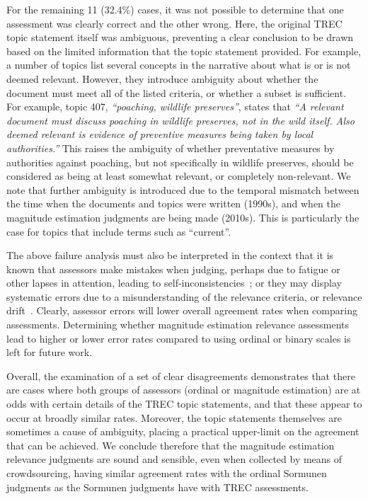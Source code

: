 For the remaining 11 (32.4\%) cases, it was not possible to
determine that one assessment was clearly correct and the
other wrong.
Here, the original TREC topic statement itself was ambiguous,
preventing a clear conclusion to be drawn based on the limited
information that the topic statement provided.
For example, a number of topics list several concepts in the narrative
about what is or is not deemed relevant.
However, they introduce ambiguity about whether the document must meet
all of the listed criteria, or whether a subset is sufficient.
For example, topic 407, \emph{``poaching, wildlife preserves''}, states
that 
\emph{``A relevant document must discuss poaching in wildlife
preserves, not in the wild itself.
Also deemed relevant is evidence of preventive measures being taken by
local authorities.''} This raises the ambiguity of whether preventative
measures by authorities against poaching, but not specifically in
wildlife preserves, should be considered as being at least somewhat
relevant,
or completely non-relevant.
We note that further ambiguity is introduced due to the temporal
mismatch between the time when the documents and topics were written (1990s),
and when the magnitude estimation judgments are being made (2010s).
This is particularly the case for topics that include terms such as
``current''.

The above failure analysis must also be interpreted in the context
that it is known that assessors make mistakes when judging, perhaps
due to fatigue or other lapses in attention, leading to
self-in{\-}con{\-}sistencies~\cite{CarSob10,SchTur11}; or they may
display systematic errors due to a misunderstanding of the relevance
criteria, or relevance drift~\cite{WebPic13}.
Clearly, assessor errors will lower overall agreement rates when
comparing assessments. 
Determining whether magnitude estimation relevance assessments lead to
higher or lower error rates compared to using ordinal or binary scales
is left for future work.

Overall, the examination of a set of clear disagreements demonstrates
that there are cases where both groups of assessors (ordinal or
magnitude estimation) are at odds with certain details of the TREC
topic statements, and that these appear to occur at broadly similar
rates. 
Moreover, the topic statements themselves are sometimes a cause of
ambiguity, placing a practical upper-limit on the agreement that can
be achieved.
We conclude therefore that the magnitude estimation relevance
judgments are sound and sensible, even when collected by means of
  crowdsourcing,  having similar agreement rates with
the ordinal Sormunen judgments as the Sormunen judgments have with
TREC assessments. 

